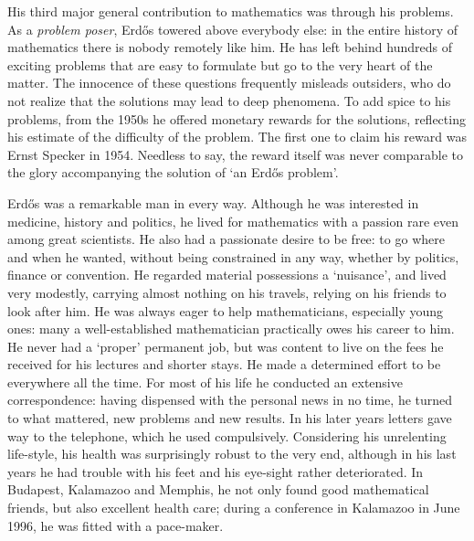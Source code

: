 His third major general contribution to mathematics was through his problems.
As a {\it problem poser}, Erd\H{o}s towered above everybody else:  
in the entire history of mathematics there is nobody remotely like him.
He has left behind hundreds of exciting problems that are easy to 
formulate but go to the very heart of the matter. 
The innocence of these questions 
frequently misleads outsiders, who do not realize that the solutions may 
lead to deep phenomena.
To add spice to his problems, from the 1950s he offered 
monetary rewards for the solutions, reflecting his estimate
of the difficulty of the problem. The first one to claim his reward was Ernst 
Specker in 1954. Needless to say, the reward itself  
was never comparable to the glory accompanying the
solution of `an Erd\H{o}s problem'.


Erd\H{o}s was a remarkable man in every way. Although he was 
interested in medicine, history and politics, he lived for mathematics with
a passion rare even among great scientists. He also had a passionate 
desire to be free: to go where and when he wanted, without being constrained
in any way, whether by politics, finance or convention. He regarded 
material possessions a `nuisance', and lived very modestly, carrying 
almost nothing on his travels,  relying on his friends to look after
him. He was always eager to help mathematicians, especially young ones: 
many a well-established mathematician practically owes his career to him. He
never had a `proper' permanent job, but was content to live on the fees he
received for his lectures and shorter stays. 
He made a determined effort to be everywhere all the time. For most of his
life he conducted an extensive correspondence: having dispensed with
the personal news in no time, he turned to what mattered, new problems and
new results. 
In his later years letters gave way to the telephone, which he 
used compulsively.
Considering his unrelenting
life-style, his health was surprisingly robust to the very end, 
although in his last years
he had trouble with his feet and his eye-sight rather deteriorated. In 
Budapest, Kalamazoo and Memphis, he not only found good mathematical friends,
but also excellent health care; during a conference in Kalamazoo in June 
1996, he was fitted with a pace-maker.


